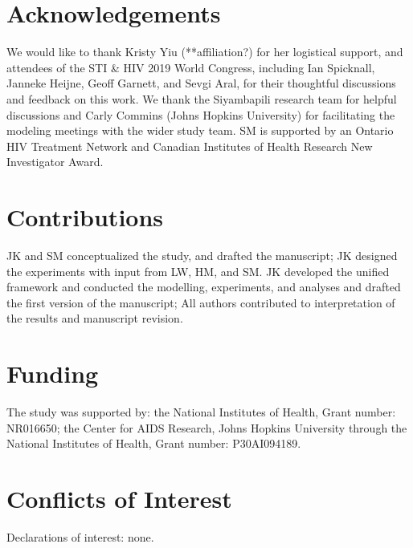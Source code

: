 \section*{Acknowledgements}
We would like to thank Kristy Yiu (**affiliation?) for her logistical support,
and attendees of the STI \& HIV 2019 World Congress,
including Ian Spicknall, Janneke Heijne, Geoff Garnett, and Sevgi Aral,   
for their thoughtful discussions and feedback on this work. %
We thank the Siyambapili research team for helpful discussions and Carly Commins (Johns Hopkins University)
for facilitating the modeling meetings with the wider study team. %
SM is supported by an Ontario HIV Treatment Network and
Canadian Institutes of Health Research New Investigator Award.
\section*{Contributions}
JK and SM conceptualized the study, and drafted the manuscript;
JK designed the experiments with input from LW, HM, and SM.
JK developed the unified framework and conducted the modelling, experiments, %
and analyses and drafted the first version of the manuscript; 
All authors contributed to
  interpretation of the results and manuscript revision.
\section*{Funding}			%
The study was supported by:
the National Institutes of Health, Grant number: NR016650;
the Center for AIDS Research, Johns Hopkins University
  through the National Institutes of Health, Grant number: P30AI094189.
\section*{Conflicts of Interest}
Declarations of interest: none.